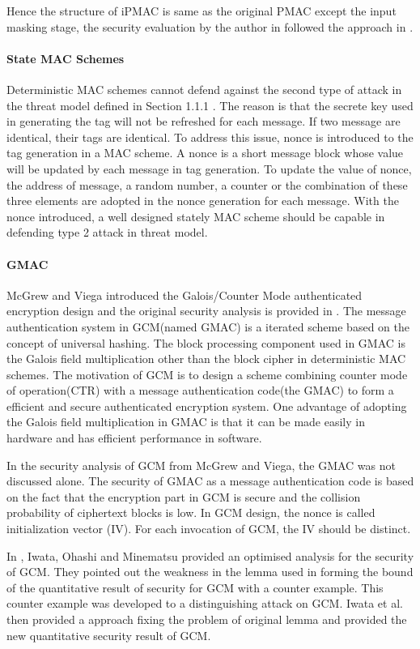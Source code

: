 \documentclass{article}
\begin{document}
Hence the structure of iPMAC is same as the original PMAC except the input masking stage, the security evaluation by the author in \cite{iPMAC} followed the approach in \cite{pmac}.

\paragraph{State MAC Schemes}
Deterministic MAC schemes cannot defend against the second type of attack in the threat model defined in Section 1.1.1 . The reason is that the secrete key used in generating the tag will not be refreshed for each message. If two message are identical, their tags are identical. To address this issue, nonce is introduced to the tag generation in a MAC scheme. A nonce is a short message block whose value will be updated by each message in tag generation. To update the value of nonce, the address of message, a random number, a counter or the combination of these three elements are adopted in the nonce generation for each message. With the nonce introduced, a well designed stately MAC scheme should be capable in defending type 2 attack in threat model.
\paragraph{GMAC}
McGrew and Viega introduced the Galois/Counter Mode authenticated encryption design and the original security analysis is provided in \cite{gcm}. The message authentication system in GCM(named GMAC) is a iterated scheme based on the concept of universal hashing. The block processing component used in GMAC is the Galois field multiplication other than the block cipher in deterministic MAC schemes. 
The motivation of GCM is to design a scheme combining counter mode of operation(CTR) with a message authentication code(the GMAC) to form a efficient and secure authenticated encryption system.
One advantage of adopting the Galois field multiplication in GMAC is that it can be made easily in hardware and has efficient performance in software. 

In the security analysis of GCM from McGrew and Viega, the GMAC was not discussed alone. The security of GMAC as a message authentication code is based on the fact that the encryption part in GCM is secure and the collision probability of ciphertext blocks is low. 
In GCM design, the nonce is called initialization vector (IV). For each invocation of GCM, the IV should be distinct.

In \cite{breaking}, Iwata, Ohashi and Minematsu provided an optimised analysis for the security of GCM. They pointed out the weakness in the lemma used in forming the bound of the quantitative result of security for GCM with a counter example. This counter example was developed to a distinguishing attack on GCM. Iwata et al. then provided a approach fixing the problem of original lemma and provided the new quantitative security result of GCM. 
\end{document}
